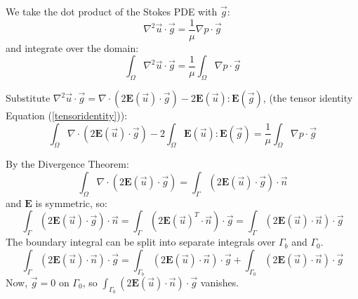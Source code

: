 \documentclass[12pt, a4paper, twoside, openright]{book}
\begin{document}
We take the dot product of the Stokes PDE with $\vec{g}$:
\begin{equation}
\nabla^2 \vec{u} \cdot \vec{g} = \frac{1}{\mu} \nabla p \cdot \vec{g}
\end{equation}
and integrate over the domain:
\begin{equation}
\int_{\Omega} \nabla^2 \vec{u} \cdot \vec{g} = 
\frac{1}{\mu} \int_{\Omega}  \nabla p \cdot \vec{g}
\end{equation}




Substitute  $ \nabla^2 \vec{u} \cdot \vec{g} = \nabla \cdot ( 2 \mathbf{E}(\vec{u}) \cdot \vec{g}) - 2 \mathbf{E}(\vec{u}):\mathbf{E}(\vec{g}) $, (the tensor identity Equation (\ref{tensoridentity})):
\begin{equation}
\int_{\Omega} \nabla \cdot ( 2 \mathbf{E}(\vec{u}) \cdot \vec{g} ) - 
2 \int_{\Omega} \mathbf{E}(\vec{u}) : \mathbf{E}(\vec{g})  = 
\frac{1}{\mu} \int_{\Omega}  \nabla p \cdot \vec{g}
\end{equation}

By the Divergence Theorem:
\begin{equation}
\int_{\Omega} \nabla \cdot ( 2 \mathbf{E}(\vec{u}) \cdot \vec{g} ) =
\int_{\Gamma} ( 2 \mathbf{E}(\vec{u}) \cdot \vec{g} ) \cdot \vec{n}
\end{equation}
and $\mathbf{E}$ is symmetric, so:
\begin{equation}
\int_{\Gamma} ( 2 \mathbf{E}(\vec{u}) \cdot \vec{g} ) \cdot \vec{n} =
\int_{\Gamma} ( 2 \mathbf{E}(\vec{u})^T \cdot \vec{n} ) \cdot \vec{g} =
\int_{\Gamma} ( 2 \mathbf{E}(\vec{u}) \cdot \vec{n} ) \cdot \vec{g}
\end{equation}
The boundary integral can be split into separate integrals over $\Gamma_b$ and $\Gamma_0$.\begin{equation}
\int_{\Gamma} ( 2 \mathbf{E}(\vec{u}) \cdot \vec{n} ) \cdot \vec{g} =
\int_{\Gamma_b} ( 2 \mathbf{E}(\vec{u}) \cdot \vec{n} ) \cdot \vec{g} +
\int_{\Gamma_0} ( 2 \mathbf{E}(\vec{u}) \cdot \vec{n} ) \cdot \vec{g}
\end{equation}
Now, $\vec{g} = 0$ on $\Gamma_0$, so $ \int_{\Gamma_0} ( 2 \mathbf{E}(\vec{u}) \cdot \vec{n} ) \cdot \vec{g} $ vanishes.
\end{document}
